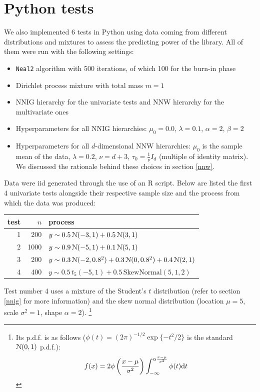 \section{Python tests}\label{chap-py-test}
We also implemented 6 tests in Python using data coming from different distributions and mixtures to assess the predicting power of the library.
All of them were run with the following settings:
\begin{itemize}
	\item \verb|Neal2| algorithm with 500 iterations, of which 100 for the burn-in phase
	\item Dirichlet process mixture with total mass $m=1$
	\item NNIG hierarchy for the univariate tests and NNW hierarchy for the multivariate ones
	\item Hyperparameters for all NNIG hierarchies: $\mu_0 = 0.0$, $\lambda = 0.1$, $\alpha = 2$, $\beta = 2$
	\item Hyperparameters for all $d$-dimensional NNW hierarchies: $\mu_0$ is the sample mean of the data, $\lambda = 0.2$, $\nu = d + 3$, $\tau_0 = \frac{1}{\nu} I_d$ (multiple of identity matrix). We discussed the rationale behind these choices in section \ref{nnw}.
\end{itemize}
Data were iid generated through the use of an R script.
Below are listed the first 4 univariate tests alongside their respective sample size and the process from which the data was produced:
\begin{center}
	\begin{tabular}{r|r|l}
		test & $n$ & process \\ \hline
		1 &  200 & $y \sim 0.5 \, \mathcal N(-3, 1) + 0.5 \, \mathcal N(3, 1)$ \\
		2 & 1000 & $y \sim 0.9 \, \mathcal N(-5, 1) + 0.1 \, \mathcal N(5, 1)$ \\
		3 &  200 & $y \sim 0.3 \, \mathcal N(-2, 0.8^2) + 0.3 \, \mathcal N(0, 0.8^2) + 0.4 \, \mathcal N(2, 1)$ \\
		4 &  400 & $y \sim 0.5 \, t_5(-5, 1 ) + 0.5 \, \text{SkewNormal}(5, 1, 2)$
	\end{tabular}
\end{center}
Test number 4 uses a mixture of the Student's $t$ distribution (refer to section \ref{nnig} for more information) and the skew normal distribution (location $\mu=5$, scale $\sigma^2=1$, shape $\alpha=2$). \footnote{Its p.d.f. is as follows ($\phi(t) = (2\pi)^{-1/2} \exp\{-t^2/2\}$ is the standard $\mathcal N(0,1)$ p.d.f.):
$$
f(x) = 2 \phi\left(\frac{x-\mu}{\sigma^2}\right) \int_{-\infty}^{\alpha \frac{x-\mu}{\sigma^2}} \phi(t) \mathrm d t
$$}
